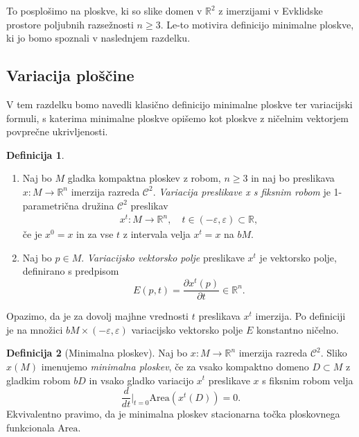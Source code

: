 \documentclass[12pt,a4paper,twoside]{article}
\theoremstyle{definition} %
\newtheorem{definicija}{Definicija}[section]
\theoremstyle{plain} %
\numberwithin{equation}{section}  %
\newcommand{\R}{\mathbb R}
\begin{document}
To posplošimo na ploskve, ki so slike domen v $\R^2$ z imerzijami v Evklidske prostore poljubnih razsežnosti $n \geq 3$. Le-to motivira definicijo minimalne ploskve, ki jo bomo spoznali v naslednjem razdelku.

\subsection{Variacija ploščine}
V tem razdelku bomo navedli klasično definicijo minimalne ploskve ter variacijski formuli, s katerima minimalne ploskve opišemo kot ploskve z ničelnim vektorjem povprečne ukrivljenosti.
%
\begin{definicija}
\begin{enumerate}
\item
Naj bo $M$ gladka kompaktna ploskev z robom, $n \geq 3$ in naj bo preslikava $x \colon M \to \R^{n}$ imerzija razreda $\mathcal{C}^2$. \emph{Variacija preslikave x s fiksnim robom} je 1-parametrična družina $\mathcal{C}^2$ preslikav 
\begin{gather}
x^{t} \colon M \to \R^{n}, \quad t \in (-\varepsilon, \varepsilon) \subset \R,
\end{gather}
če je $x^0 = x$ in za vse $t$ z intervala velja $x^{t} = x$ na $bM$.
%
\item
Naj bo $p \in M$. \emph{Variacijsko vektorsko polje} preslikave $x^{t}$ je vektorsko polje, definirano s predpisom
\begin{equation}
E(p,t) = \frac{\partial{x^t(p)}}{\partial{t}} \in \R^{n}.
\end{equation}
\end{enumerate}
\end{definicija}

Opazimo, da je za dovolj majhne vrednosti $t$ preslikava $x^{t}$ imerzija.
Po definiciji je na množici $bM \times (-\varepsilon, \varepsilon)$ variacijsko vektorsko polje $E$ konstantno ničelno.

\begin{definicija} [Minimalna ploskev] \label{def:min-ploskev}
Naj bo $x \colon M \to \R^{n}$ imerzija razreda $\mathcal{C}^2$. Sliko $x(M)$ imenujemo \emph{minimalna ploskev}, če za vsako kompaktno domeno $D \subset M$ z gladkim robom $bD$ in vsako gladko variacijo $x^{t}$ preslikave $x$ s fiksnim robom velja
\begin{equation} \label{eq:1-var-ploščine}
\frac{d}{dt} \Big|_{t=0} \text{Area} \left(x^{t}(D)\right) = 0.
\end{equation}
Ekvivalentno pravimo, da je minimalna ploskev stacionarna točka ploskovnega funkcionala $\text{Area}$.
\end{definicija}
\end{document}
